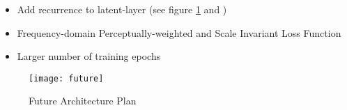\begin{itemize}
	\item Add recurrence to latent-layer (see figure \ref{fig:future} and \cite{defossez_music_nodate})
	\item Frequency-domain Perceptually-weighted  and Scale Invariant Loss Function
	\item Larger number of training epochs
\end{itemize}

\begin{figure}
	\centering
	\texttt{[image: future]}
	\caption{Future Architecture Plan}
	\label{fig:future}
\end{figure}
